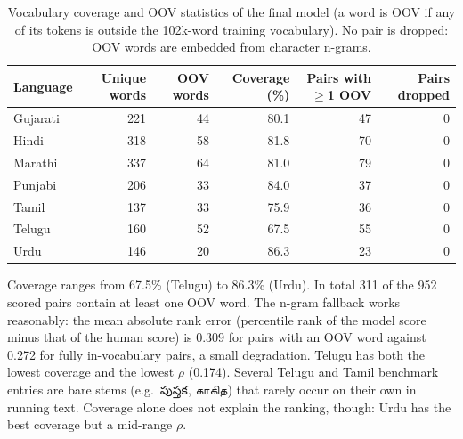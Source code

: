 \documentclass[11pt,a4paper]{article}
\begin{document}
\begin{table}[H]\centering\small
\caption{Vocabulary coverage and OOV statistics of the final model (a word is OOV if any of its tokens is outside the 102k-word training vocabulary). No pair is dropped: OOV words are embedded from character n-grams.}
\begin{tabular}{lrrrrr}\toprule
Language & Unique words & OOV words & Coverage (\%) & Pairs with $\geq$1 OOV & Pairs dropped \\\midrule
Gujarati & 221 & 44 & 80.1 & 47 & 0 \\
Hindi & 318 & 58 & 81.8 & 70 & 0 \\
Marathi & 337 & 64 & 81.0 & 79 & 0 \\
Punjabi & 206 & 33 & 84.0 & 37 & 0 \\
Tamil & 137 & 33 & 75.9 & 36 & 0 \\
Telugu & 160 & 52 & 67.5 & 55 & 0 \\
Urdu & 146 & 20 & 86.3 & 23 & 0 \\
\bottomrule\end{tabular}\end{table}
Coverage ranges from 67.5\% (Telugu) to 86.3\% (Urdu). In total 311 of the 952 scored pairs contain at least one OOV word. The n-gram fallback works reasonably: the mean absolute rank error (percentile rank of the model score minus that of the human score) is 0.309 for pairs with an OOV word against 0.272 for fully in-vocabulary pairs, a small degradation. Telugu has both the lowest coverage and the lowest $\rho$ (0.174). Several Telugu and Tamil benchmark entries are bare stems (e.g.\ {\tel పుస్తక}, {\tam காகித}) that rarely occur on their own in running text. Coverage alone does not explain the ranking, though: Urdu has the best coverage but a mid-range $\rho$.
\end{document}
